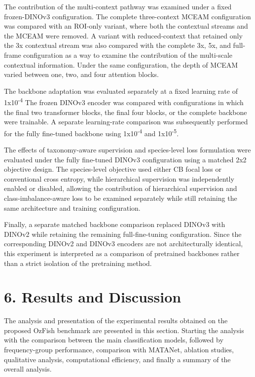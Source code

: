 \documentclass[preprint,12pt]{elsarticle}
\begin{document}
The contribution of the multi-context pathway was examined under a fixed
frozen-DINOv3 configuration. The complete three-context MCEAM
configuration \cite{ref26} was compared with an
ROI-only variant, where both the contextual streams and the MCEAM were
removed. A variant with reduced-context that retained only the 3x
contextual stream was also compared with the complete 3x, 5x, and
full-frame configuration as a way to examine the contribution of the
multi-scale contextual information. Under the same configuration, the
depth of MCEAM varied between one, two, and four attention blocks.

The backbone adaptation was evaluated separately at a fixed learning
rate of 1x10\textsuperscript{-4}\cite{ref51} The
frozen DINOv3 encoder was compared with configurations in which the
final two transformer blocks, the final four blocks, or the complete
backbone were trainable. A separate learning-rate comparison was
subsequently performed for the fully fine-tuned backbone using
1x10\textsuperscript{-4} and 1x10\textsuperscript{-5}.

The effects of taxonomy-aware supervision and species-level loss
formulation were evaluated under the fully fine-tuned DINOv3
configuration using a matched 2x2 objective design. The species-level
objective used either CB focal loss \cite{ref14}
\cite{ref63} or conventional cross entropy,
while hierarchical supervision \cite{ref24}
\cite{ref26} was independently enabled or
disabled, allowing the contribution of hierarchical supervision and
class-imbalance-aware loss to be examined separately while still
retaining the same architecture and training configuration.

Finally, a separate matched backbone comparison replaced DINOv3
\cite{ref25} with DINOv2
\cite{ref47} while retaining the remaining
full-fine-tuning configuration. Since the corresponding DINOv2 and
DINOv3 encoders are not architecturally identical, this experiment is
interpreted as a comparison of pretrained backbones rather than a strict
isolation of the pretraining method.

\section*{6. Results and Discussion}\label{results-and-discussion}

The analysis and presentation of the experimental results obtained on
the proposed OzFish benchmark are presented in this section. Starting
the analysis with the comparison between the main classification models,
followed by frequency-group performance, comparison with MATANet,
ablation studies, qualitative analysis, computational efficiency, and
finally a summary of the overall analysis.
\end{document}
